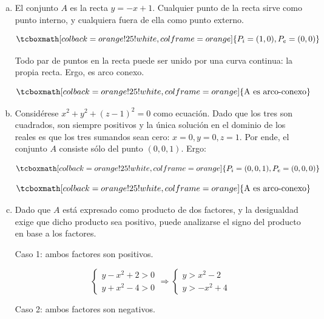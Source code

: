 \documentclass{article}
\begin{document}
\begin{enumerate}[(a)]
\item El conjunto $A$ es la recta $y = -x + 1$. Cualquier punto de la recta sirve como punto interno, y cualquiera fuera de ella como punto externo.

\begin{equation}
\tcboxmath[colback=orange!25!white,colframe=orange]
{
P_i = (1, 0), P_e = (0, 0)
}
\end{equation}

Todo par de puntos en la recta puede ser unido por una curva continua: la propia recta. Ergo, es arco conexo.

\begin{equation}
\tcboxmath[colback=orange!25!white,colframe=orange]
{ \text{A es arco-conexo} }
\end{equation}

\item Considérese $x^2 + y^2 + (z-1)^2 = 0$ como ecuación. Dado que los tres son cuadrados, son siempre positivos y la única solución en el dominio de los reales es que los tres sumandos sean cero: $x = 0, y = 0, z = 1$. Por ende, el conjunto $A$ consiste sólo del punto $(0, 0, 1)$. Ergo:

\begin{equation}
\tcboxmath[colback=orange!25!white,colframe=orange]
{
P_i = (0, 0, 1), P_e = (0, 0, 0)
}
\end{equation}

\begin{equation}
\tcboxmath[colback=orange!25!white,colframe=orange]
{ \text{A es arco-conexo} }
\end{equation}

\item Dado que $A$ está expresado como producto de dos factores, y la desigualdad exige que dicho producto sea positivo, puede analizarse el signo del producto en base a los factores.

Caso 1: ambos factores son positivos.

\begin{equation}
\left\{ \begin{array}{ll}
y - x^2 + 2 > 0 \\
y + x^2 -4 > 0
\end{array}
\right. \Rightarrow \left\{ \begin{array}{ll}
y > x^2 - 2 \\
y > -x^2 + 4
\end{array}
\right.
\end{equation}

Caso 2: ambos factores son negativos.


\end{enumerate}
\end{document}
